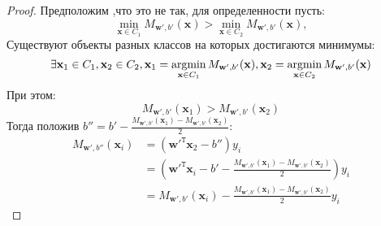 \documentclass[%
bachelor,    %
subf,        %
href,        %
colorlinks,  %
]{disser}
\let\vec=\mathbf
\DeclareMathOperator*{\argmin}{argmin}
\begin{document}
\begin{proof}
Предположим ,что это не так, для определенности пусть: $$\min_{\vec{x} \in C_1} M_{\vec{w}',b'}(\vec{x}) > \min_{\vec{x} \in C_2} M_{\vec{w}',b'}(\vec{x}),$$  Существуют объекты разных классов на которых достигаются минимумы:
$$ \exists \vec{x}_1 \in C_1, \vec{x}_2 \in C_2,\\
\vec{x}_1 = \argmin_{\vec{x} \in C_1}M_{\vec{w}',b'}(\vec{x}) , \vec{x}_2 = \argmin_{\vec{x} \in C_2}M_{\vec{w}',b'}(\vec{x})$$
При этом:$$M_{\vec{w}',b'}(\vec{x}_1)>M_{\vec{w}',b'}(\vec{x}_2)$$
Тогда положив $b'' = b' - \frac{M_{\vec{w}',b'}(\vec{x}_1)-M_{\vec{w}',b'}(\vec{x}_2)}{2} $:
\begin{equation*}
\begin{aligned}
M_{\vec{w}',b''}(\vec{x}_i) &=(\vec{w}'^{\mathtt{T}}\vec{x}_2 -  b'')y_i \\
&=(\vec{w}'^{\mathtt{T}}\vec{x}_i -  b' - \frac{M_{\vec{w}',b'}(\vec{x}_1)-M_{\vec{w}',b'}(\vec{x}_2)}{2})y_i \\
&=M_{\vec{w}',b'}(\vec{x}_i) - \frac{M_{\vec{w}',b'}(\vec{x}_1)-M_{\vec{w}',b'}(\vec{x}_2)}{2}y_i 
\end{aligned}
\end{equation*}


\end{proof}
\end{document}
